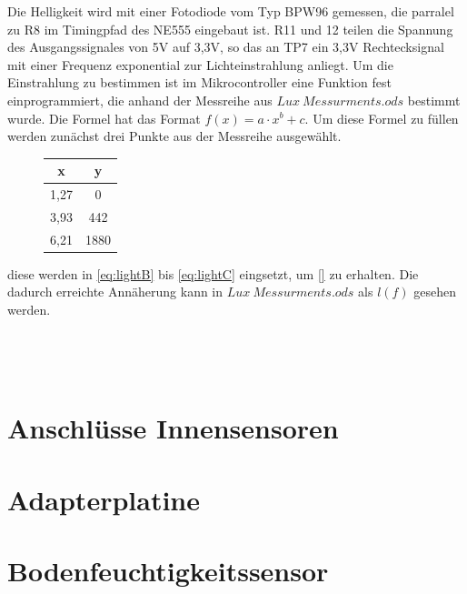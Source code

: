 \documentclass[12pt, a4paper, oneside]{report}
\begin{document}
Die Helligkeit wird mit einer Fotodiode vom Typ BPW96 \cite{ds:light} gemessen, die parralel zu R8 im Timingpfad des NE555 eingebaut ist. R11 und 12 teilen die Spannung des Ausgangssignales von 5V auf 3,3V, so das an TP7 ein 3,3V Rechtecksignal mit einer Frequenz exponential zur Lichteinstrahlung anliegt. Um die Einstrahlung zu bestimmen ist im Mikrocontroller eine Funktion fest einprogrammiert, die anhand der Messreihe aus $Lux~Messurments.ods$ bestimmt wurde. Die Formel hat das Format $f(x)=a \cdot x^b + c$. Um diese Formel zu füllen werden zunächst drei Punkte aus der Messreihe ausgewählt.

\begin{figure}[h]
\centering
\begin{tabular}{c|c}
	x & y\\
	\hline
	1,27 & 0\\
	3,93 & 442\\
	6,21 & 1880\\
\end{tabular}
\end{figure}

diese werden in \autoref{eq:lightB} bis \ref{eq:lightC} eingsetzt, um \autoref{} zu erhalten. Die dadurch erreichte Annäherung kann in $Lux~Messurments.ods$ als $l(f)$ gesehen werden.

\begin{align}
\label{eq:lightB}
\end{align}

\begin{align}
\label{eq:lightA}
\end{align}

\begin{align}
\label{eq:lightC}
\end{align}

\section{Anschlüsse Innensensoren}
\label{sec:Innensensoren}

\section{Adapterplatine}
\label{sec:Adapterplatine}

\section{Bodenfeuchtigkeitssensor}
\label{sec:Bodenfeuchtigkeitssensor}
\end{document}
